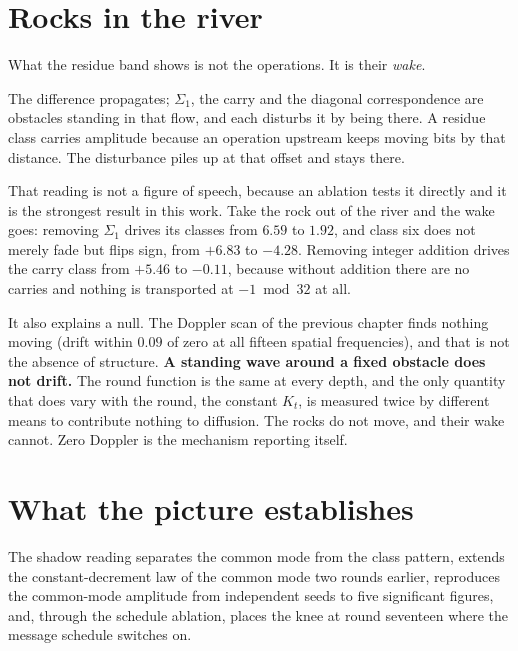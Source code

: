 \section{Rocks in the river}

What the residue band shows is not the operations. It is their \emph{wake}.

The difference propagates; \(\Sigma_1\), the carry and the diagonal correspondence are
obstacles standing in that flow, and each disturbs it by being there. A residue class carries
amplitude because an operation upstream keeps moving bits by that distance. The disturbance
piles up at that offset and stays there.

That reading is not a figure of speech, because an ablation tests it directly and it is the strongest
result in this work. Take the rock out of the river and the wake goes: removing \(\Sigma_1\) drives
its classes from \(6.59\) to \(1.92\), and class six does not merely fade but flips sign, from
\(+6.83\) to \(-4.28\). Removing integer addition drives the carry class from \(+5.46\) to
\(-0.11\), because without addition there are no carries and nothing is transported at
\(-1 \bmod 32\) at all.

It also explains a null. The Doppler scan of the previous chapter finds nothing moving (drift within
\(0.09\) of zero at all fifteen spatial frequencies), and that is not the absence of structure.
\textbf{A standing wave around a fixed obstacle does not drift.} The round function is the same at
every depth, and the only quantity that does vary with the round, the constant \(K_t\), is measured
twice by different means to contribute nothing to diffusion. The rocks do not move, and their wake
cannot. Zero Doppler is the mechanism reporting itself.

\section{What the picture establishes}

The shadow reading separates the common mode from the class pattern, extends the constant-decrement
law of the common mode two rounds earlier, reproduces the common-mode amplitude from independent
seeds to five significant figures, and, through the schedule ablation, places the knee at round
seventeen where the message schedule switches on.
